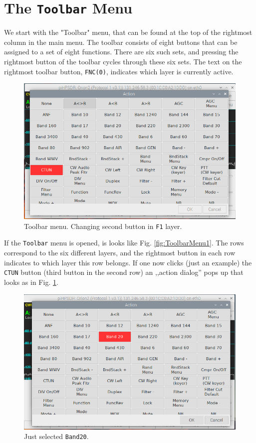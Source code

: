 \documentclass[12pt]{book}
\def\rett#1{\texttt{\color{red}#1}}
\def\bltt#1{\texttt{\color{blue}#1}}
\begin{document}
\section{The \texttt{Toolbar} Menu}
\label{sec:toolbarmenu}
We start with the "Toolbar" menu, that can be found at the top of the rightmost
column in the main menu. The toolbar consists of eight buttons that can be assigned
to a set of eight functions. There are six such sets, and pressing the rightmost button
of the toolbar cycles through these six sets. The text on the rightmost toolbar button, \rett{FNC(0)}, indicates which
layer is currently active.

\begin{figure}[ht!]
\center
\includegraphics[width=12cm]{ToolbarMenu2.png}
\caption{Toolbar menu. Changing second button in \texttt{F1} layer.}
\label{fig:ToolbarMenu2}
\end{figure}

If the \bltt{Toolbar} menu is opened, is looks like Fig. \ref{fig:ToolbarMenu1}.
The rows correspond to the six different layers, and the rightmost button in each
row indicates to which layer this row belongs.
 If one now clicks (just an example)
the \texttt{CTUN} button (third button in the second row) an ,,action dialog'' pops up that looks as
in Fig. \ref{fig:ToolbarMenu2}.


\begin{figure}[ht!]
\center
\includegraphics[width=12cm]{ToolbarMenu3.png}
\caption{Just selected \texttt{Band20}.}
\label{fig:ToolbarMenu3}
\end{figure}
\end{document}
